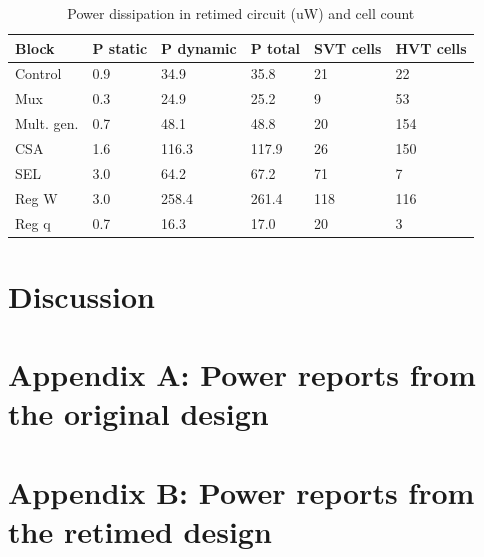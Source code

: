 \documentclass[11pt,a4paper]{article}
\begin{document}
\begin{table}[h !]
\caption{Power dissipation in retimed circuit (uW) and cell count}
\begin{center}
\begin{tabular}{|l|l|l|l|l|l|} %
\hline
\textbf{Block}	& \textbf{P static}		& \textbf{P dynamic}	& \textbf{P total} & \textbf{SVT cells} & \textbf{HVT cells}\\ \hline
Control & 0.9 & 34.9 & 35.8 & 21 & 22 \\ \hline
Mux & 0.3 & 24.9 & 25.2 & 9 & 53 	\\ \hline
Mult. gen. & 0.7 & 48.1 & 48.8 & 20 & 154 	\\ \hline
CSA & 1.6 & 116.3 & 117.9 & 26 & 150 	\\ \hline
SEL & 3.0 & 64.2 & 67.2 & 71 & 7 	\\ \hline
Reg W & 3.0 & 258.4 & 261.4 & 118 & 116 	\\ \hline
Reg q & 0.7 & 16.3 & 17.0 & 20 & 3 \\ \hline
\end{tabular}
\end{center}
\label{table:powerRetimed}
\end{table}
\floatbarrier
\section{Discussion}

\section{Appendix A: Power reports from the original design}

\section{Appendix B: Power reports from the retimed design}



\end{document}
